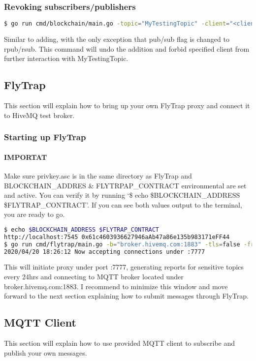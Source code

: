 \subsubsection{Revoking subscribers/publishers}
\begin{lstlisting}[language=bash,breaklines=true]
$ go run cmd/blockchain/main.go -topic="MyTestingTopic" -client="<client_pubkey>" -rpub="Revoking publisher"
\end{lstlisting}
Similar to adding, with the only exception that pub/sub flag is changed to rpub/rsub. This command will undo the addition and forbid specified client from further interaction with MyTestingTopic.
\subsection{FlyTrap}
This section will explain how to bring up your own FlyTrap proxy and connect it to HiveMQ test broker.
\subsubsection{Starting up FlyTrap}
\paragraph{IMPORTAT} Make sure privkey.asc is in the same directory as FlyTrap and BLOCKCHAIN\_ADDRES \& FLYTRPAP\_CONTRACT environmental are set and active. You can verify it by running `\$ echo \$BLOCKCHAIN\_ADDRESS \$FLYTRAP\_CONTRACT'. If you can see both values output to the terminal, you are ready to go.
\begin{lstlisting}[language=bash,breaklines=true]
$ echo $BLOCKCHAIN_ADDRESS $FLYTRAP_CONTRACT
http://localhost:7545 0x61c4603936627946aAb47a86e135b983171eFF44
$ go run cmd/flytrap/main.go -b="broker.hivemq.com:1883" -tls=false -freq=24h -p ":7777"
2020/04/20 18:26:12 Now accepting connections under :7777
\end{lstlisting}
This will initiate proxy under port :7777, generating reports for sensitive topics every 24hrs and connecting to MQTT broker located under broker.hivemq.com:1883. I recommend to minimize this window and move forward to the next section explaining how to submit messages through FlyTrap.
\subsection{MQTT Client}
This section will explain how to use provided MQTT client to subscribe and publish your own messages. 

